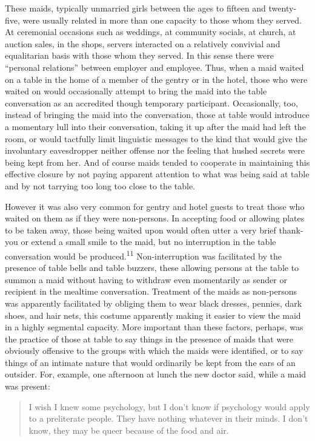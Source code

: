 \documentclass[openany,nobib]{tufte-book}
\begin{document}
These maids, typically unmarried girls between the ages to fifteen and
twenty-five, were usually related in more than one capacity to those
whom they served. At ceremonial occasions such as weddings, at community
socials, at church, at auction sales, in the shops, servers interacted
on a relatively convivial and equalitarian basis with those whom they
served. In this sense there were ``personal relations'' between employer
and employee. Thus, when a maid waited on a table in the home of a
member of the gentry or in the hotel, those who were waited on would
occasionally attempt to bring the maid into the table conversation as an
accredited though temporary participant. Occasionally, too, instead of
bringing the maid into the conversation, those at table would introduce
a momentary lull into their conversation, taking it up after the maid
had left the room, or would tactfully limit linguistic messages to the
kind that would give the involuntary eavesdropper neither offense nor
the feeling that hushed secrets were being kept from her. And of course
maids tended to cooperate in maintaining this effective closure by not
paying apparent attention to what was being said at table and by not
tarrying too long too close to the table.

However it was also very common for gentry and hotel guests to treat
those who waited on them as if they were non-persons. In accepting food
or allowing plates to be taken away, those being waited upon would often
utter a very brief thank-you or extend a small smile to the maid, but no
interruption in the table conversation would be produced.\textsuperscript{11} Non-interruption was
facilitated by the presence of table bells and table buzzers, these
allowing persons at the table to summon a maid without having to
withdraw even momentarily as sender or recipient in the mealtime
conversation. Treatment of the maids as non-persons was apparently
facilitated by obliging them to wear black dresses, pennies, dark shoes,
and hair nets, this costume apparently making it easier to view the maid
in a highly segmental capacity. More important than these factors,
perhaps, was the practice of those at table to say things in the
presence of maids that were obviously offensive to the groups with which
the maids were identified, or to say things of an intimate nature that
would ordinarily be kept from the ears of an outsider. For, example, one
afternoon at lunch the new doctor said, while a maid was present:

\begin{quote}
I wish I knew some psychology, but I don't know if psychology would
apply to a preliterate people. They have nothing whatever in their
minds. I don't know, they may be queer because of the food and air.
\end{quote}
\end{document}
